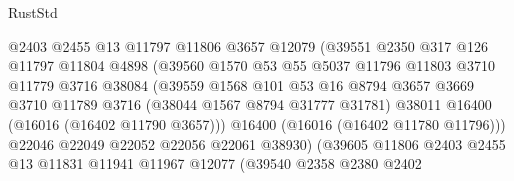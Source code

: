 \begin{lexlean}{RustStd}
\begin{coremodule}
                                @2403
                                @2455
                                @13
                                @11797
                                @11806
                                @3657
                                @12079
                                (@39551
                                  @2350
                                  @317
                                  @126
                                  @11797
                                  @11804
                                  @4898
                                  (@39560
                                    @1570
                                    @53
                                    @55
                                    @5037
                                    @11796
                                    @11803
                                    @3710
                                    @11779
                                    @3716
                                    @38084
                                    (@39559
                                      @1568
                                      @101
                                      @53
                                      @16
                                      @8794
                                      @3657
                                      @3669
                                      @3710
                                      @11789
                                      @3716
                                      (@38044 @1567 @8794 @31777 @31781)
                                      @38011
                                      @16400
                                      (@16016 (@16402 @11790 @3657)))
                                    @16400
                                    (@16016 (@16402 @11780 @11796)))
                                  @22046
                                  @22049
                                  @22052
                                  @22056
                                  @22061
                                  @38930)
                                (@39605
                                  @11806
                                  @2403
                                  @2455
                                  @13
                                  @11831
                                  @11941
                                  @11967
                                  @12077
                                  (@39540
                                    @2358
                                    @2380
                                    @2402

\end{coremodule}
\end{lexlean}

